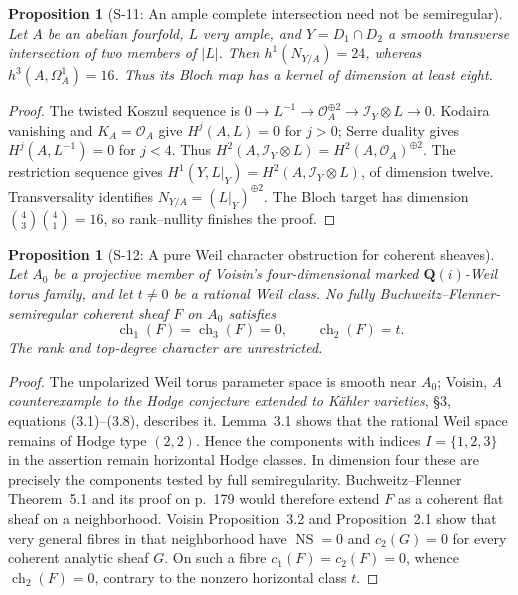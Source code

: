 \documentclass[11pt,a4paper]{article}
\newtheorem{proposition}[theorem]{Proposition}
\theoremstyle{definition}
\begin{document}
\begin{proposition}[S-11: An ample complete intersection need not be semiregular]
\label{prop:semireg-ci-counterexample}
Let $A$ be an abelian fourfold, $L$ very ample, and
$Y=D_1\cap D_2$ a smooth transverse intersection of two members
of $|L|$. Then $h^1(N_{Y/A})=24$, whereas
$h^3(A,\Omega_A^1)=16$. Thus its Bloch map has a kernel of
dimension at least eight.
\end{proposition}
\begin{proof}
The twisted Koszul sequence is
$0\to L^{-1}\to\mathcal O_A^{\oplus2}\to\mathcal I_Y\otimes L\to0$.
Kodaira vanishing and $K_A=\mathcal O_A$ give $H^j(A,L)=0$ for
$j>0$; Serre duality gives $H^j(A,L^{-1})=0$ for $j<4$.
Thus
$H^2(A,\mathcal I_Y\otimes L)=H^2(A,\mathcal O_A)^{\oplus2}$.
The restriction sequence gives
$H^1(Y,L|_Y)=H^2(A,\mathcal I_Y\otimes L)$, of dimension twelve.
Transversality identifies $N_{Y/A}=(L|_Y)^{\oplus2}$.
The Bloch target has dimension
$\binom43\binom41=16$, so rank--nullity finishes the proof.
\end{proof}

\begin{proposition}[S-12: A pure Weil character obstruction for coherent sheaves]
\label{prop:semireg-pure-weil-no-go}
Let $A_0$ be a projective member of Voisin's four-dimensional
marked $\mathbf Q(i)$-Weil torus family, and let $t\ne0$ be a
rational Weil class. No fully Buchweitz--Flenner-semiregular
coherent sheaf $F$ on $A_0$ satisfies
\[
 \operatorname{ch}_1(F)=\operatorname{ch}_3(F)=0,\qquad
 \operatorname{ch}_2(F)=t.
\]
The rank and top-degree character are unrestricted.
\end{proposition}
\begin{proof}
The unpolarized Weil torus parameter space is smooth near $A_0$;
Voisin, \emph{A counterexample to the Hodge conjecture extended
to K\"ahler varieties}, \S3, equations (3.1)--(3.8), describes it.
Lemma~3.1 shows that the rational Weil space remains of Hodge
type $(2,2)$. Hence the components with indices $I=\{1,2,3\}$
in the assertion remain horizontal Hodge classes. In dimension
four these are precisely the components tested by full
semiregularity.
Buchweitz--Flenner Theorem~5.1 and its proof on p.~179 would
therefore extend $F$ as a coherent flat sheaf on a neighborhood.
Voisin Proposition~3.2 and Proposition~2.1 show that very general
fibres in that neighborhood have $\operatorname{NS}=0$ and
$c_2(G)=0$ for every coherent analytic sheaf $G$.
On such a fibre $c_1(F)=c_2(F)=0$, whence
$\operatorname{ch}_2(F)=0$, contrary to the nonzero horizontal
class $t$.
\end{proof}
\end{document}
